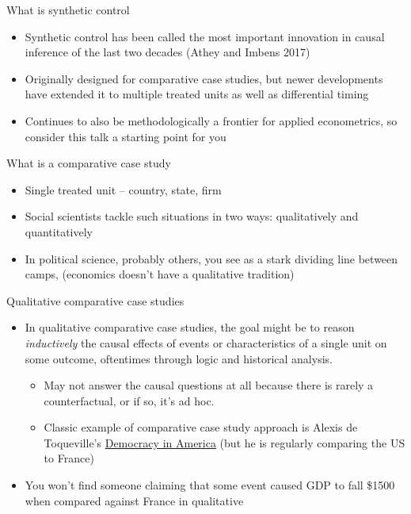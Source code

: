 \documentclass{beamer}
\begin{document}
\begin{frame}{What is synthetic control}
	
	\begin{itemize}
	\item Synthetic control has been called the most important innovation in causal inference of the last two decades (Athey and Imbens 2017)
	\item Originally designed for comparative case studies, but newer developments have extended it to multiple treated units as well as differential timing
	\item Continues to also be methodologically a frontier for applied econometrics, so consider this talk a starting point for you
	\end{itemize}
\end{frame}
	
\begin{frame}{What is a comparative case study}

\begin{itemize}
\item Single treated unit -- country, state, firm
\item Social scientists tackle such situations in two ways: qualitatively and quantitatively
\item In political science, probably others, you see as a stark dividing line between camps, (economics doesn't have a qualitative tradition)
\end{itemize}

\end{frame}


\begin{frame}{Qualitative comparative case studies}
	
	\begin{itemize}
	\item In qualitative comparative case studies, the goal might be to reason \emph{inductively} the causal effects of events or characteristics of a single unit on some outcome, oftentimes through logic and historical analysis.  
		\begin{itemize}
		\item May not answer the causal questions at all because there is rarely a counterfactual, or if so, it's ad hoc.
		\item Classic example of comparative case study approach is Alexis de Toqueville's \underline{Democracy in America} (but he is regularly comparing the US to France)
		\end{itemize}
	\item You won't find someone claiming that some event caused GDP to fall \$1500 when compared against France in qualitative
	\end{itemize}
\end{frame}
\end{document}
